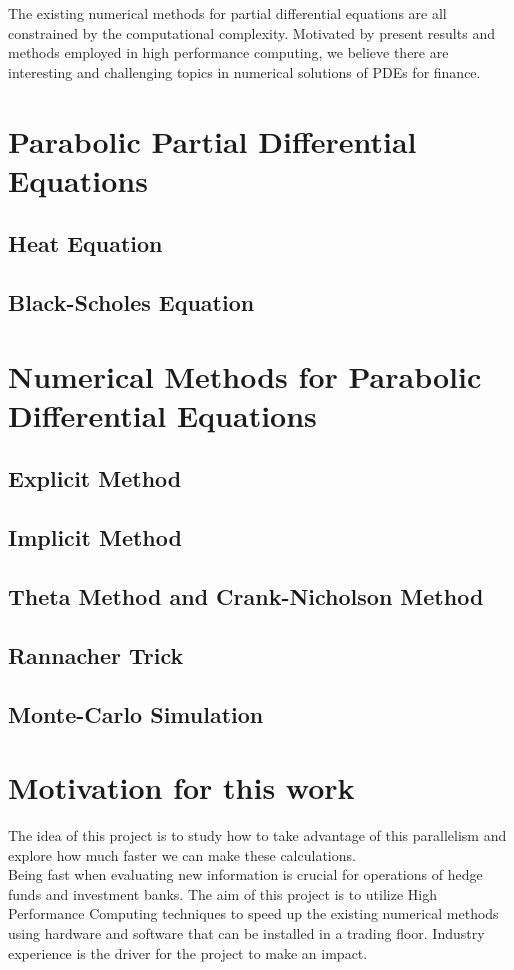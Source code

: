 \documentclass[12pt, oneside]{book}
\theoremstyle{plain}
\theoremstyle{definition}
\begin{document}
The existing numerical methods for partial differential equations are all constrained by the computational complexity. Motivated by present results and methods employed in high performance computing, we believe there are interesting and challenging topics in numerical solutions of PDEs for finance.

\section{Parabolic Partial Differential Equations}\label{Parabolic Partial Differential Equations}
\lipsum[5]
\subsection{Heat Equation}
\lipsum[5]
\subsection{Black-Scholes Equation}
\lipsum[5]
\section{Numerical Methods for Parabolic Differential Equations}
\lipsum[5]
\subsection{Explicit Method}
\lipsum[5]
\subsection{Implicit Method}
\lipsum[5]
\subsection{Theta Method and Crank-Nicholson Method}
\lipsum[5]
\subsection{Rannacher Trick}
\lipsum[5]
\subsection{Monte-Carlo Simulation}
\lipsum[5]

\section{Motivation for this work}
The idea of this project is to study how to take advantage of this parallelism and explore how much faster we can make these calculations.
\\
Being fast when evaluating new information is crucial for operations of hedge funds and investment banks. The aim of this project is to utilize High Performance Computing techniques to speed up the existing numerical methods using hardware and software that can be installed in a trading floor. Industry experience is the driver for the project to make an impact.
\end{document}
